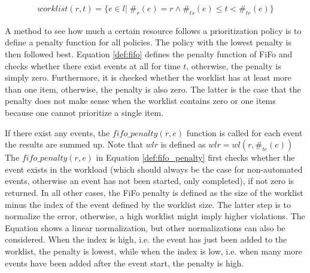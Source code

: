 \begin{equation}\label{def:worklist}
  \begin{array}{l}
    worklist(r, t) =  \{e \in l |\; \#_r(e) = r \wedge \#_{ts}(e) \leq t < \#_{te}(e)   \}
  \end{array}
\end{equation}

    

A method to see how much a certain resource follows a prioritization policy is to define a penalty function for all policies. The policy with the lowest penalty is then followed best. Equation \ref{def:fifo} defines the penalty function of FiFo and checks whether there exist events at all for time $t$, otherwise, the penalty is simply zero. Furthermore, it is checked whether the worklist has at least more than one item, otherwise, the penalty is also zero. The latter is the case that the penalty does not make sense when the worklist contains zero or one items because one cannot prioritize a single item. 

If there exist any events, the $fifo\_penalty(r,e)$ function is called for each event the results are summed up. Note that $wlr$ is defined as $wlr = wl(r, \#_{te}(e))$ The $fifo\_penalty(r,e)$ in Equation \ref{def:fifo_penalty} first checks whether the event exists in the workload (which should always be the case for non-automated events, otherwise an event has not been started, only completed), if not zero is returned. In all other cases, the FiFo penalty is defined as the size of the worklist minus the index of the event defined by the worklist size. The latter step is to normalize the error, otherwise, a high worklist might imply higher violations. The Equation shows a linear normalization, but other normalizations can also be considered. When the index is high, i.e. the event has just been added to the worklist, the penalty is lowest, while when the index is low, i.e. when many more events have been added after the event start, the penalty is high.     

